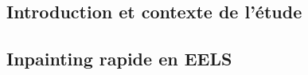 \documentclass[a4paper, asymetric, table, justified,
               nofonts, nobib, nohyper, 10pt, french]{tufte-book}
\begin{document}

\frontmatter
\makeflyleaf
\pagestyle{fancyfrontmatter}

\setcounter{chapter}{-1}
\setcounter{secnumdepth}{3}
\setcounter{tocdepth}{1}




%
%



%
%





%
%

\begin{fullwidth}
    \tableofcontents
\end{fullwidth}


%
%


%
%



\mainmatter
\setcounter{tocdepth}{2}

%
%


%
%

\begin{fullwidth}
	\part{Introduction et contexte de l'étude}
\end{fullwidth}





%
%

\begin{fullwidth}
	\part{Inpainting rapide en EELS}
\end{fullwidth}
\end{document}
